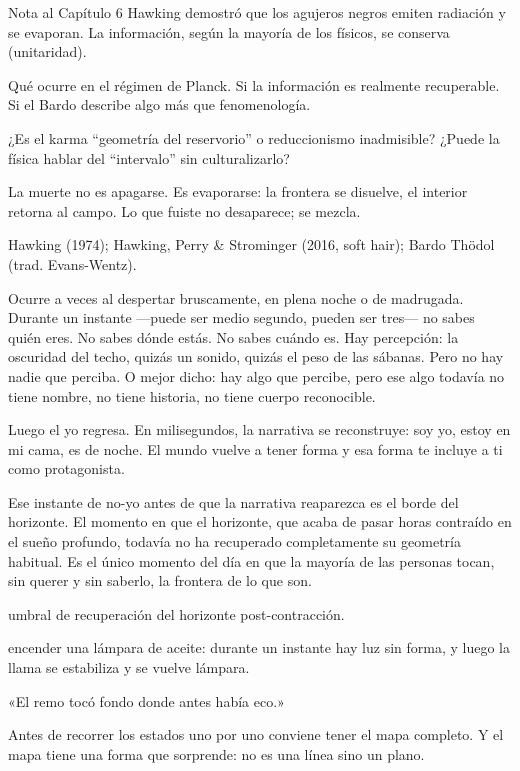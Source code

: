 \begin{notacap}{Nota al Capítulo 6}
 Hawking demostró que los agujeros negros emiten radiación y se evaporan. La información, según la mayoría de los físicos, se conserva (unitaridad).

 Qué ocurre en el régimen de Planck. Si la información es realmente recuperable. Si el Bardo describe algo más que fenomenología.

 ¿Es el karma “geometría del reservorio” o reduccionismo inadmisible? ¿Puede la física hablar del “intervalo” sin culturalizarlo?

 La muerte no es apagarse. Es evaporarse: la frontera se disuelve, el interior retorna al campo. Lo que fuiste no desaparece; se mezcla.

 Hawking (1974); Hawking, Perry \& Strominger (2016, soft hair); Bardo Thödol (trad. Evans-Wentz).
\end{notacap}
\noindent {}

Ocurre a veces al despertar bruscamente, en plena noche o de madrugada. Durante un instante —puede ser medio segundo, pueden ser tres— no sabes quién eres. No sabes dónde estás. No sabes cuándo es. Hay percepción: la oscuridad del techo, quizás un sonido, quizás el peso de las sábanas. Pero no hay nadie que perciba. O mejor dicho: hay algo que percibe, pero ese algo todavía no tiene nombre, no tiene historia, no tiene cuerpo reconocible.

Luego el yo regresa. En milisegundos, la narrativa se reconstruye: soy yo, estoy en mi cama, es de noche. El mundo vuelve a tener forma y esa forma te incluye a ti como protagonista.

Ese instante de no-yo antes de que la narrativa reaparezca es el borde del horizonte. El momento en que el horizonte, que acaba de pasar horas contraído en el sueño profundo, todavía no ha recuperado completamente su geometría habitual. Es el único momento del día en que la mayoría de las personas tocan, sin querer y sin saberlo, la frontera de lo que son.

\begin{fisica}
 umbral de recuperación del horizonte post-contracción.

 encender una lámpara de aceite: durante un instante hay luz sin forma, y luego la llama se estabiliza y se vuelve lámpara.
\end{fisica}
\begin{cita}
«El remo tocó fondo donde antes había eco.»
\end{cita}
\noindent Antes de recorrer los estados uno por uno conviene tener el mapa completo. Y el mapa tiene una forma que sorprende: no es una línea sino un plano.

